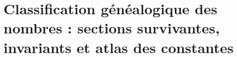 \chapter{Classification généalogique des nombres : sections survivantes, invariants et atlas des constantes}
\label{chap:p3-final:52:atlas_numero}



